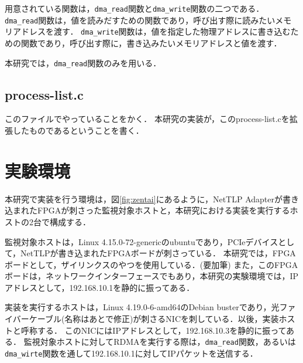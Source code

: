 用意されている関数は，\verb|dma_read|関数と\verb|dma_write|関数の二つである．
\verb|dma_read|関数は，値を読みだすための関数であり，呼び出す際に読みたいメモリアドレスを渡す．
\verb|dma_write|関数は，値を指定した物理アドレスに書き込むための関数であり，呼び出す際に，書き込みたいメモリアドレスと値を渡す．

本研究では，\verb|dma_read|関数のみを用いる．

\subsection{process-list.c}

このファイルでやっていることをかく．
本研究の実装が，このprocess-list.cを拡張したものであるということを書く．

\section{実験環境}

本研究で実装を行う環境は，図\ref{fig:zentai}にあるように，NetTLP Adapterが書き込まれたFPGAが刺さった監視対象ホストと，本研究における実装を実行するホストの2台で構成する．

監視対象ホストは，Linux 4.15.0-72-genericのubuntuであり，PCIeデバイスとして，NetTLPが書き込まれたFPGAボードが刺さっている．
本研究では，FPGAボードとして，ザイリンクスのやつを使用している．(要加筆)
また，このFPGAボードは，ネットワークインターフェースでもあり，本研究の実験環境では，IPアドレスとして，192.168.10.1を静的に振ってある．

実装を実行するホストは，Linux 4.19.0-6-amd64のDebian busterであり，光ファイバーケーブル(名称はあとで修正)が刺さるNICを刺している．以後，実装ホストと呼称する．
このNICにはIPアドレスとして，192.168.10.3を静的に振ってある．
監視対象ホストに対してRDMAを実行する際は，\verb|dma_read|関数，あるいは\verb|dma_wirte|関数を通して192.168.10.1に対してIPパケットを送信する．

